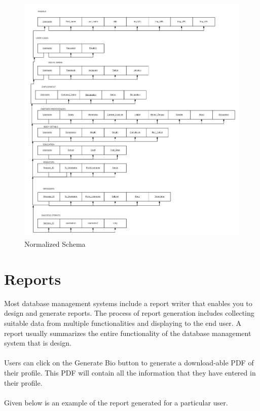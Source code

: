 \documentclass[12pt]{report}
\begin{document}
\begin{figure}[!htb]
    \centering
    \includegraphics[width=1\textwidth]{Normalized-Tables.png}
    \caption{Normalized Schema}
    \label{fig:Normalized Schema}
\end{figure}
 
\chapter{Reports} 
Most database management systems include a report
writer that enables you to design and generate reports. The process of report generation includes
collecting suitable data from multiple functionalities and displaying to the end user. A report usually
summarizes the entire functionality of the database management system that is design. \\\\
Users can click on the Generate Bio button to generate a download-able PDF of their profile. This PDF will contain all the information that they have entered in their profile. \\\\
Given below is an example of the report generated for a particular user.
\end{document}
